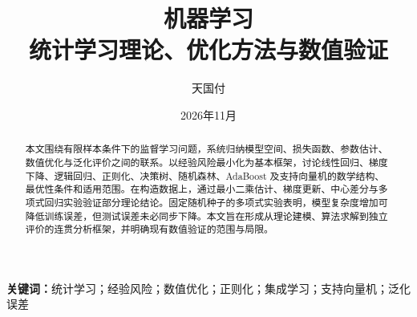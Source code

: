 \documentclass[UTF8,a4paper,12pt]{ctexart}
\title{机器学习\\[3pt]\large 统计学习理论、优化方法与数值验证}
\author{天国\quad 付}
\date{2026年11月}
\begin{document}
\maketitle
\thispagestyle{plain}

\begin{abstract}
本文围绕有限样本条件下的监督学习问题，系统归纳模型空间、损失函数、参数估计、数值优化与泛化评价之间的联系。以经验风险最小化为基本框架，讨论线性回归、梯度下降、逻辑回归、正则化、决策树、随机森林、AdaBoost 及支持向量机的数学结构、最优性条件和适用范围。在构造数据上，通过最小二乘估计、梯度更新、中心差分与多项式回归实验验证部分理论结论。固定随机种子的多项式实验表明，模型复杂度增加可降低训练误差，但测试误差未必同步下降。本文旨在形成从理论建模、算法求解到独立评价的连贯分析框架，并明确现有数值验证的范围与局限。
\end{abstract}
\noindent\textbf{关键词：}统计学习；经验风险；数值优化；正则化；集成学习；支持向量机；泛化误差

\clearpage
\setcounter{tocdepth}{2}
\tableofcontents
\clearpage
{}
















\clearpage
\printbibliography[heading=bibintoc,title={参考文献}]
\end{document}
